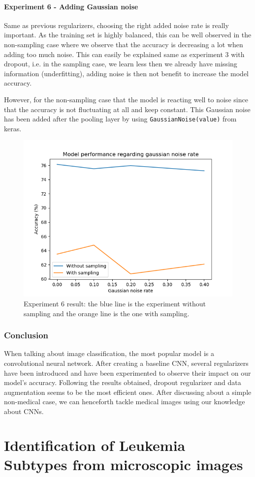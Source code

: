 \documentclass[11pt, openany]{report}
\theoremstyle{plain}
\theoremstyle{definition}
\theoremstyle{remark}
\begin{document}
\subsubsection{Experiment 6 - Adding Gaussian noise} 
Same as previous regularizers, choosing the right added noise rate is really important. As the training set is highly balanced, this can be well observed in the non-sampling case where we observe that the accuracy is decreasing a lot when adding too much noise. This can easily be explained same as experiment 3 with dropout, i.e. in the sampling case, we learn less then we already have missing information (underfitting), adding noise is then not benefit to increase the model accuracy.

However, for the non-sampling case that the model is reacting well to noise since that the accuracy is not fluctuating at all and keep constant. This Gaussian noise has been added after the pooling layer by using \texttt{GaussianNoise(value)} from keras.   

\begin{figure}[H]
  \centering
  \includegraphics[scale=0.6]{Code/ch5-ModelPrototype/figures_result/gaussian_noise_graph.png}
  \caption{Experiment 6 result: the blue line is the experiment without sampling and the orange line is the one with sampling.}
  \label{fig:cifar_noise_res}
\end{figure}


\subsection{Conclusion}
When talking about image classification, the most popular model is a convolutional neural network. After creating a baseline CNN, several regularizers have been introduced and have been experimented to observe their impact on our model's accuracy. Following the results obtained, dropout regularizer and data augmentation seems to be the most efficient ones. After discussing about a simple non-medical case, we can henceforth tackle medical images using our knowledge about CNNs. 


\chapter{Identification of Leukemia Subtypes from microscopic images}








\nocite{*}

\end{document}
